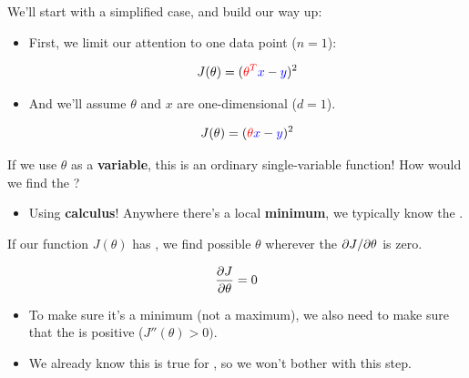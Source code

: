         We'll start with a simplified case, and build our way up:

        \begin{itemize}
            \item First, we limit our attention to one data point ($n=1$):

                \begin{equation}
                    J(\theta) =(\textcolor{red}{ \theta^T} \textcolor{blue}{x}   - \textcolor{blue}{y} )^2
                \end{equation}

            \item And we'll assume $\theta$ and $x$ are one-dimensional ($d=1$).

                \begin{equation}
                    J(\theta) = (\textcolor{red}{\theta} \textcolor{blue}{x}   - \textcolor{blue}{y} )^2
                \end{equation}
        \end{itemize}

        \phantom{}
        
        
        If we use $\theta$ as a \textbf{variable}, this is an ordinary single-variable function! How would we find the ? 

        \begin{itemize}
            \item Using \textbf{calculus}! Anywhere there's a local \textbf{minimum}, we typically know the .
                \\
        \end{itemize}

        \begin{concept}
            
            If our function $J(\theta)$ has , we find possible  $\theta$ wherever the  ${\partial J}/{\partial \theta}$ is zero.
            
            \begin{equation*}
                \frac{\partial J}{\partial \theta}=0
            \end{equation*}

            \phantom{}

            \begin{itemize}
                \item To make sure it's a minimum (not a maximum), we also need to make sure that the  is positive ($J''(\theta)>0)$.

                \item We already know this is true for , so we won't bother with this step.
            \end{itemize}
        \end{concept}

